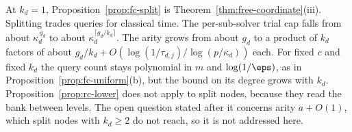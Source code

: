 At $k_d = 1$, Proposition~\ref{prop:fc-split} is Theorem~\ref{thm:free-coordinate}(iii). Splitting trades queries for classical time. The per-sub-solver trial cap falls from about $\kappa_d^{\,g_d}$ to about $\kappa_d^{\lceil g_d/k_d\rceil}$. The arity grows from about $g_d$ to a product of $k_d$ factors of about $g_d/k_d + O(\log(1/\tau_{d,j})/\log(p/\kappa_d))$ each. For fixed $c$ and fixed $k_d$ the query count stays polynomial in $m$ and $\log(1/\eps)$, as in Proposition~\ref{prop:fc-uniform}(b), but the bound on its degree grows with $k_d$. Proposition~\ref{prop:rc-lower} does not apply to split nodes, because they read the bank between levels. The open question stated after it concerns arity $a + O(1)$, which split nodes with $k_d \ge 2$ do not reach, so it is not addressed here.
